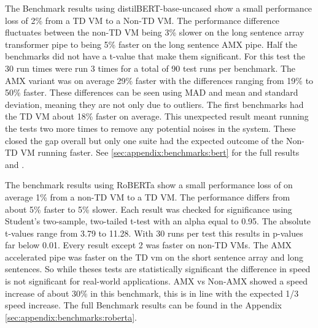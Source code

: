 The Benchmark results using distilBERT-base-uncased show a small performance loss of 2\% from a TD VM to a Non-TD VM. The performance difference fluctuates between the non-TD VM being 3\% slower on the long sentence array transformer pipe to being 5\% faster on the long sentence AMX pipe. Half the benchmarks did not have a t-value that make them significant. For this test the 30 run times were run 3 times for a total of 90 test runs per benchmark. The AMX variant was on average 29\% faster with the differences ranging from 19\% to 50\% faster.
These differences can be seen using MAD and mean and standard deviation, meaning they are not only due to outliers. The first benchmarks had the TD VM about 18\% faster on average. This unexpected result meant running the tests two more times to remove any potential noises in the system. These closed the gap overall but only one suite had the expected outcome of the Non-TD VM running faster. See \ref{sec:appendix:benchmarks:bert} for the full results and .

The benchmark results using RoBERTa show a small performance loss of on average 1\% from a non-TD VM to a TD VM. The performance differs from about 5\% faster to 5\% slower. Each result was checked for significance using Student’s two-sample, two-tailed t-test with an alpha equal to 0.95. The absolute t-values range from 3.79 to 11.28. With 30 runs per test this results in p-values far below 0.01. Every result except 2 was faster on non-TD VMs. The AMX accelerated pipe was faster on the TD vm on the short sentence array and long sentences. So while theses tests are statistically significant the difference in speed is not significant for real-world applications. AMX vs Non-AMX showed a speed increase of about 30\% in this benchmark, this is in line with the expected 1/3 speed increase.
The full Benchmark results can be found in the Appendix \ref{sec:appendix:benchmarks:roberta}.


